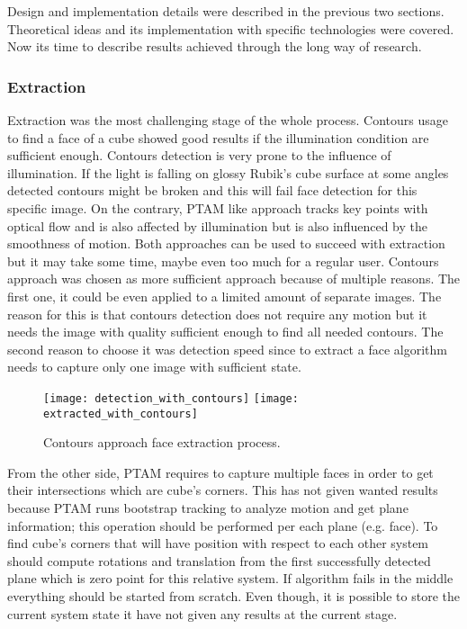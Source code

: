 \documentclass[../../main.tex]{subfiles}
\begin{document}
Design and implementation details were described in the previous two sections. Theoretical ideas and its implementation with specific technologies were covered. Now its time to describe results achieved through the long way of research.

\subsubsection*{Extraction}

Extraction was the most challenging stage of the whole process. Contours usage to find a face of a cube showed good results if the illumination condition are sufficient enough. Contours detection is very prone to the influence of illumination. If the light is falling on glossy Rubik's cube surface at some angles detected contours might be broken and this will fail face detection for this specific image. On the contrary, \ac{PTAM} like approach tracks key points with optical flow and is also affected by illumination but is also influenced by the smoothness of motion. Both approaches can be used to succeed with extraction but it may take some time, maybe even too much for a regular user. Contours approach was chosen as more sufficient approach because of multiple reasons. The first one, it could be even applied to a limited amount of separate images. The reason for this is that contours detection does not require any motion but it needs the image with quality sufficient enough to find all needed contours. The second reason to choose it was detection speed since to extract a face algorithm needs to capture only one image with sufficient state. 

\begin{figure} [ht!]
    \begin{center}
        \texttt{[image: detection\_with\_contours]}
        \texttt{[image: extracted\_with\_contours]}
        \caption{Contours approach face extraction process.}
        \label{fig:contours_approach_face_detection}
    \end{center}
\end{figure}

From the other side, \ac{PTAM} requires to capture multiple faces in order to get their intersections which are cube's corners. This has not given wanted results because \ac{PTAM} runs bootstrap tracking to analyze motion and get plane information; this operation should be performed per each plane (e.g. face). To find cube's corners that will have position with respect to each other system should compute rotations and translation from the first successfully detected plane which is zero point for this relative system. If algorithm fails in the middle everything should be started from scratch. Even though, it is possible to store the current system state it have not given any results at the current stage.
\end{document}
